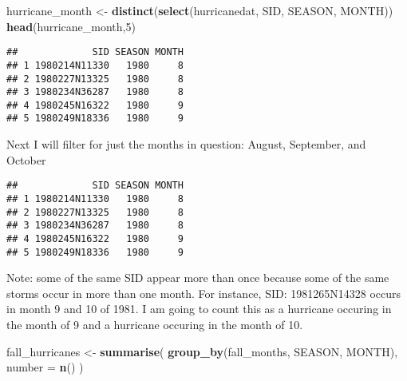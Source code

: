 \documentclass[
]{article}
\newenvironment{Shaded}{\begin{snugshade}}{\end{snugshade}}
\newcommand{\DataTypeTok}[1]{\textcolor[rgb]{0.13,0.29,0.53}{#1}}
\newcommand{\DecValTok}[1]{\textcolor[rgb]{0.00,0.00,0.81}{#1}}
\newcommand{\KeywordTok}[1]{\textcolor[rgb]{0.13,0.29,0.53}{\textbf{#1}}}
\newcommand{\NormalTok}[1]{#1}
\newcommand{\OperatorTok}[1]{\textcolor[rgb]{0.81,0.36,0.00}{\textbf{#1}}}
\newcommand{\StringTok}[1]{\textcolor[rgb]{0.31,0.60,0.02}{#1}}
\begin{document}
\begin{Shaded}
\begin{Highlighting}[]
\NormalTok{hurricane_month <-}\StringTok{ }\KeywordTok{distinct}\NormalTok{(}\KeywordTok{select}\NormalTok{(hurricanedat, SID, SEASON, MONTH))}
\KeywordTok{head}\NormalTok{(hurricane_month,}\DecValTok{5}\NormalTok{)}
\end{Highlighting}
\end{Shaded}

\begin{verbatim}
##             SID SEASON MONTH
## 1 1980214N11330   1980     8
## 2 1980227N13325   1980     8
## 3 1980234N36287   1980     8
## 4 1980245N16322   1980     9
## 5 1980249N18336   1980     9
\end{verbatim}

Next I will filter for just the months in question: August, September,
and October

\begin{Shaded}
\end{Shaded}

\begin{verbatim}
##             SID SEASON MONTH
## 1 1980214N11330   1980     8
## 2 1980227N13325   1980     8
## 3 1980234N36287   1980     8
## 4 1980245N16322   1980     9
## 5 1980249N18336   1980     9
\end{verbatim}

Note: some of the same SID appear more than once because some of the
same storms occur in more than one month. For instance, SID:
1981265N14328 occurs in month 9 and 10 of 1981. I am going to count this
as a hurricane occuring in the month of 9 and a hurricane occuring in
the month of 10.

\begin{Shaded}
\begin{Highlighting}[]
\NormalTok{fall_hurricanes <-}\StringTok{ }\KeywordTok{summarise}\NormalTok{(}
  \KeywordTok{group_by}\NormalTok{(fall_months, SEASON, MONTH),}
  \DataTypeTok{number =} \KeywordTok{n}\NormalTok{()}
\NormalTok{)}
\end{Highlighting}
\end{Shaded}
\end{document}

